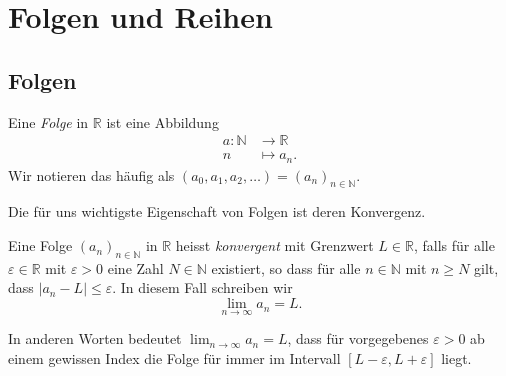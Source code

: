 \documentclass[../main.tex]{subfiles}
\begin{document}
\chapter{Folgen und Reihen}
\section{Folgen}
\begin{definition}
	Eine \textit{Folge} in $\mathbb{R}$ ist eine Abbildung
  \begin{align*}
    a \colon \mathbb{N} & \to \mathbb{R} \\
    n & \mapsto a_n.
  \end{align*}
  Wir notieren das häufig als 
  $(a_0, a_1, a_2, \dots) = {(a_n)}_{n \in \mathbb{N}}$.
\end{definition}

Die für uns wichtigste Eigenschaft von Folgen ist deren Konvergenz.

\begin{definition}
	Eine Folge ${(a_n)}_{n \in \mathbb{N}}$ in $\mathbb{R}$
	heisst \textit{konvergent} mit Grenzwert
	$L \in \mathbb{R}$, falls für alle
	$\varepsilon \in \mathbb{R}$ mit $\varepsilon > 0$
	eine Zahl $N \in \mathbb{N}$ existiert,
	so dass für alle $n\in \mathbb{N}$ 
	mit $n \geq N$ gilt, dass
	$|a_n - L| \leq \varepsilon$. In diesem Fall schreiben wir
	\[
	  \lim_{n \to \infty} a_n = L.
	\]
\end{definition}

In anderen Worten bedeutet $\lim_{n \to \infty} a_n = L$, dass
für vorgegebenes $\varepsilon > 0$
ab einem gewissen Index die Folge für immer im Intervall
$[L- \varepsilon, L + \varepsilon]$ liegt.
\end{document}
